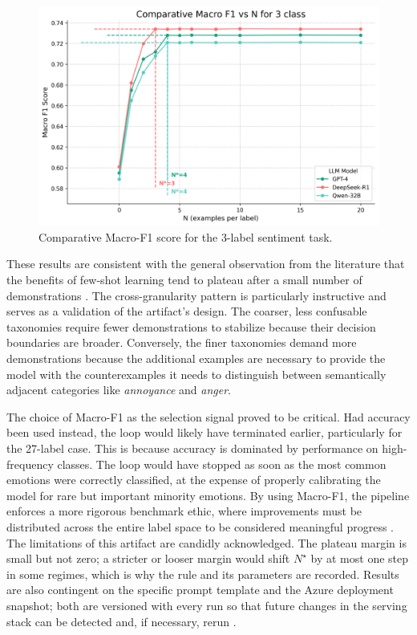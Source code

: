 \begin{figure}[H]
    \centering
    \includegraphics[width=\textwidth]{Images/comparative_3_class.png}
    \caption[Macro-F1 vs. N for 3-Label Granularity]{Comparative Macro-F1 score for the 3-label sentiment task.}
    \label{fig:comp_3}
\end{figure}

These results are consistent with the general observation from the literature that the benefits of few-shot learning tend to plateau after a small number of demonstrations \cite{brown2020gpt3}. The cross-granularity pattern is particularly instructive and serves as a validation of the artifact's design. The coarser, less confusable taxonomies require fewer demonstrations to stabilize because their decision boundaries are broader. Conversely, the finer taxonomies demand more demonstrations because the additional examples are necessary to provide the model with the counterexamples it needs to distinguish between semantically adjacent categories like \textit{annoyance} and \textit{anger}.

The choice of Macro-F1 as the selection signal proved to be critical. Had accuracy been used instead, the loop would likely have terminated earlier, particularly for the 27-label case. This is because accuracy is dominated by performance on high-frequency classes. The loop would have stopped as soon as the most common emotions were correctly classified, at the expense of properly calibrating the model for rare but important minority emotions. By using Macro-F1, the pipeline enforces a more rigorous benchmark ethic, where improvements must be distributed across the entire label space to be considered meaningful progress \cite{demszky2020goemotions}. The limitations of this artifact are candidly acknowledged. The plateau margin is small but not zero; a stricter or looser margin would shift $N^{\star}$ by at most one step in some regimes, which is why the rule and its parameters are recorded. Results are also contingent on the specific prompt template and the Azure deployment snapshot; both are versioned with every run so that future changes in the serving stack can be detected and, if necessary, rerun \cite{openai2023gpt4}.

